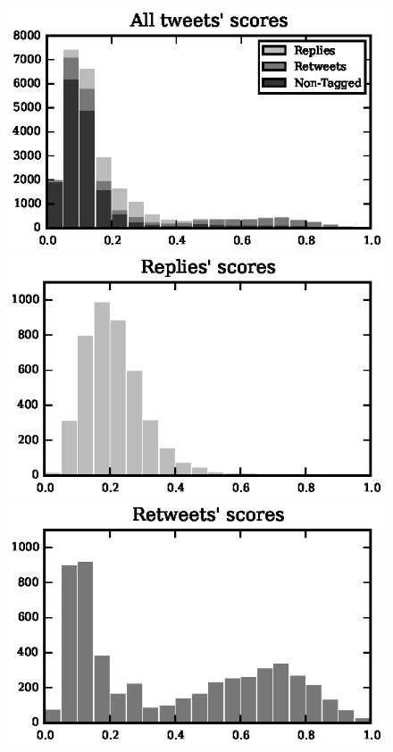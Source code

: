 \begin{figure}[!htbp]
\centering
\includegraphics{./figures/all_tfidf_histogram.eps}
\includegraphics{./figures/replies_tfidf_histogram.eps}
\includegraphics{./figures/retweets_tfidf_histogram.eps}

\end{figure}
